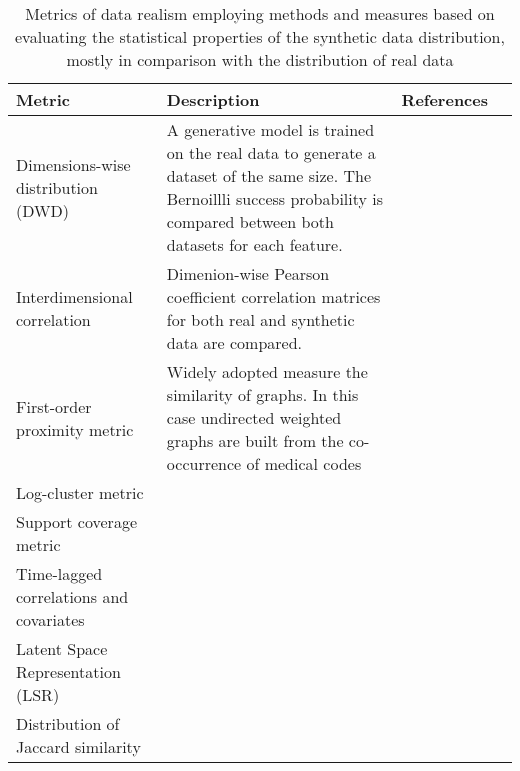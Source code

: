 \begin{table}[htpb]
    \caption{Metrics of data realism employing methods and measures based on evaluating the statistical properties of the synthetic data distribution, mostly in comparison with the distribution of real data\label{tab:statmetrics}} 
    
    \begin{tabular}{@{} p{} p{} p{} p{} @{}}\toprule
        Metric & Description & References\\ \midrule
        Dimensions-wise distribution (DWD) & A generative model is trained on the real data to generate a dataset of the same size. The Bernoillli success probability is compared between both datasets for each feature. & \cite{Beaulieu-Jones2019-ct,choi2017generating,chin2019generation,yan2020generating,Baowaly2019,Baowaly_2019,ozyigit2020generation}\\
        Interdimensional correlation & Dimenion-wise Pearson coefficient correlation matrices for both real and synthetic data are compared. & \cite{Beaulieu-Jones2019-ct, Goncalves2020}\cite{torfi2019generating,Frid_Adar_2018,Yang_2019,ozyigit2020generation}\\
        First-order proximity metric & Widely adopted measure the similarity of graphs. In this case undirected weighted graphs are built from the co-occurrence of medical codes & \cite{Zhang2020-wp}\\
        Log-cluster metric & {} & \cite{Goncalves2020}\\
        Support coverage metric & {} & \cite{Goncalves2020}\\
        Time-lagged correlations and covariates & {} & \cite{Fisher2019,walsh2020generating}\\
        Latent Space Representation (LSR) & {} & \cite{yan2020generating}\\
        Distribution of Jaccard similarity & {} & \cite{ozyigit2020generation}\\
        \bottomrule
    \end{tabular}
\end{table}